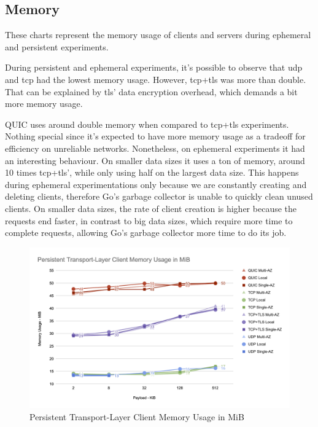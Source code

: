 \subsection{Memory}

These charts represent the memory usage of clients and servers during ephemeral and persistent experiments.

During persistent and ephemeral experiments, it’s possible to observe that \gls{udp} and \gls{tcp} had the lowest memory usage. However, \gls{tcp}+\gls{tls} was more than double. That can be explained by \gls{tls}’ data encryption overhead, which demands a bit more memory usage.

QUIC uses around double memory when compared to \gls{tcp}+\gls{tls} experiments. Nothing special since it’s expected to have more memory usage as a tradeoff for efficiency on unreliable networks. Nonetheless, on ephemeral experiments it had an interesting behaviour. On smaller data sizes it uses a ton of memory, around 10 times \gls{tcp}+\gls{tls}’, while only using half on the largest data size. This happens during ephemeral experimentations only because we are constantly creating and deleting clients, therefore Go’s garbage collector is unable to quickly clean unused clients. On smaller data sizes, the rate of client creation is higher because the requests end faster, in contrast to big data sizes, which require more time to complete requests, allowing Go’s garbage collector more time to do its job.

\clearpage

\begin{figure}[h!]
    \centering
    \includegraphics[width=\linewidth]{figures/charts/Persistent Transport-Layer Client Memory Usage in MiB.png}
    \caption{Persistent Transport-Layer Client Memory Usage in MiB}
    \label{fig:persistent_client_transport_memory}
\end{figure}

